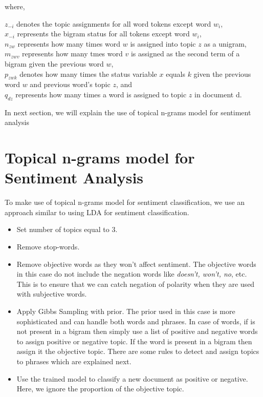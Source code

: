 where, 

\(z_{-i}\) denotes the topic assignments for all word tokens except word \(w_i\), \\ 
\(x_{-i}\) represents the bigram status for all tokens except word \(w_i\), \\ 
\(n_{zw}\) represents how many times word \(w\) is assigned into topic \(z\) as a unigram, \\
\(m_{zwv}\) represents how many tmes word \(v\) is assigned as the second term of a bigram given the previous word \(w\), \\
\(p_{zwk}\) denotes how many times the status variable \(x\) equals \(k\) given the previous word \(w\) and previous word's topic \(z\), and \\
\(q_{dz}\) represents how many times a word is assigned to topic \(z\) in document d.

In next section, we will explain the use of topical n-grams model for sentiment analysis

\section{Topical n-grams model for Sentiment Analysis}

To make use of topical n-grams model for sentiment classification, we use an approach similar to using LDA for sentiment classification.

\begin{itemize}
 \itemsep0em
 \item Set number of topics equal to 3.
 \item Remove stop-words.
 \item Remove objective words as they won't affect sentiment. The objective words in this case do not include the negation words like \textit{doesn't, 
 won't, no}, etc. This is to ensure that we can catch negation of polarity when they are used with subjective words.
 \item Apply Gibbs Sampling with prior. The prior used in this case is more sophisticated and can handle both words and phrases. In case of words, if 
 is not present in a bigram then simply use a list of positive and negative words to assign positive or negative topic. If the word is present in a 
 bigram then assign it the objective topic. There are some rules to detect and assign topics to phrases which are explained next.
 \item Use the trained model to classify a new document as positive or negative. Here, we ignore the proportion of the objective topic.
\end{itemize}

